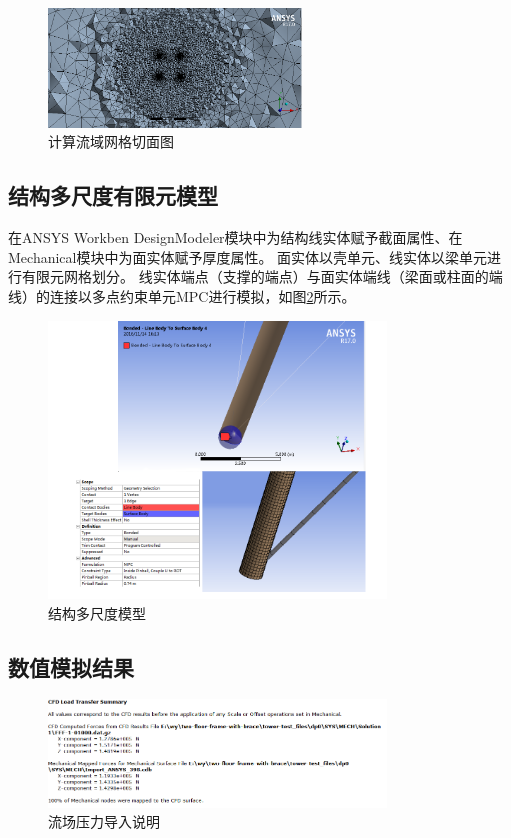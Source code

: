 \documentclass{ctexart}
\begin{document}
\begin{figure}[!htpb]
  \centering
  \includegraphics[width=0.6\textwidth]{fluid_mesh.png}
  \caption{计算流域网格切面图}
  \label{fig:fluid-mesh}
\end{figure}

\subsection{结构多尺度有限元模型}
在ANSYS Workben DesignModeler模块中为结构线实体赋予截面属性、在Mechanical模块中为面实体赋予厚度属性。
面实体以壳单元、线实体以梁单元进行有限元网格划分。
线实体端点（支撑的端点）与面实体端线（梁面或柱面的端线）的连接以多点约束单元MPC进行模拟\cite{wang2013tower}，如图\ref{fig:mpc}所示。

\begin{figure}[!htpb]
  \centering
  \includegraphics[width=0.8\textwidth]{mpc.png}
  \caption{结构多尺度模型}
  \label{fig:mpc}
\end{figure}

\subsection{数值模拟结果}

\begin{figure}[!htpb]
  \centering
  \includegraphics[width=0.8\textwidth]{load.png}
  \caption{流场压力导入说明}
  \label{fig:load}
\end{figure}
\end{document}
